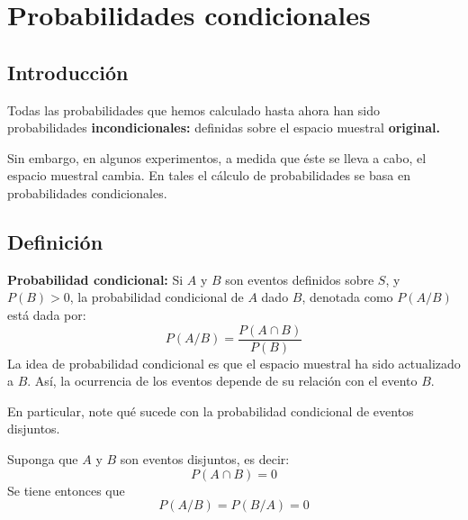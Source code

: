 \documentclass[12pt,twocolumn,a4paper]{report}
\begin{document}
\chapter*{Probabilidades condicionales}

\section*{Introducción}
Todas las probabilidades que hemos calculado hasta ahora han sido probabilidades \textbf{incondicionales:} definidas sobre el espacio muestral \textbf{original.}

Sin embargo, en algunos experimentos, a medida que éste se lleva a cabo, el espacio muestral cambia. En tales el cálculo de probabilidades se basa en probabilidades condicionales. 

\vspace{15 px}


\section*{Definición}
\textbf{Probabilidad condicional: }Si $A$ y $B$ son eventos definidos sobre $S$, y $P(B) > 0$, la probabilidad condicional de $A$ dado $B$, denotada como $P(A/B)$ está dada por: 
$$
P(A/B) = \frac{P(A \cap B)}{P(B)}
$$
La idea de probabilidad condicional es que el espacio muestral ha sido actualizado a $B$. Así, la ocurrencia de los eventos depende de su relación con el evento $B$. 

En particular, note qué sucede con la probabilidad condicional de eventos disjuntos.

Suponga que $A$ y $B$ son eventos disjuntos, es decir: 
$$
P(A\cap B) = 0
$$
Se tiene entonces que
$$
P(A/B) = P(B/A) = 0
$$
\end{document}

